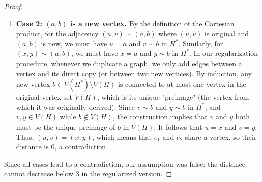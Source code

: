 \documentclass[a4paper,12pt]{article}
\begin{document}
\begin{proof}
\begin{enumerate}
        \item \textbf{Case 2: $(a, b)$ is a new vertex.} By the definition of the Cartesian product, for the adjacency $(u, v) \sim (a, b)$ where $(u, v)$ is original and $(a, b)$ is new, we must have $u = a$ and $v \sim  b$ in $H^*$. Similarly, for $(x, y) \sim (a, b)$, we must have $x = a$ and $y \sim  b$ in $H^*$. In our regularization procedure, whenever we duplicate a graph, we only add edges between a vertex and its direct copy (or between two new vertices). By induction, any new vertex $b \in V(H^*) \setminus V(H)$ is connected to at most one vertex in the original vertex set $V(H)$, which is its unique "preimage" (the vertex from which it was originally derived). Since $v \sim  b$ and $y \sim  b$ in $H^*$, and $v, y \in V(H)$ while $b \notin V(H)$, the construction implies that $v$ and $y$ both must be the unique preimage of $b$ in $V(H)$. It follows that $u = x$ and $v = y$. Thus, $(u, v) = (x, y)$, which means that $e_1$ and $e_2$ share a vertex, so their distance is 0, a contradiction.
    \end{enumerate}    

    Since all cases lead to a contradiction, our assumption was false: the distance cannot decrease below 3 in the regularized version.
\end{proof}

\end{document}
